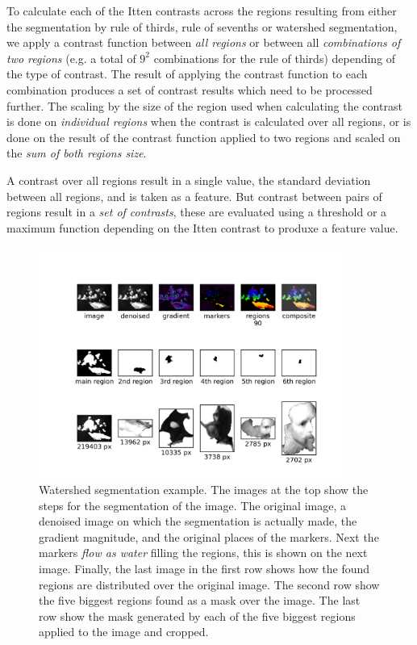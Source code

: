 \documentclass[11pt,a4paper,twoside,openright]{report}
\begin{document}
To calculate each of the Itten contrasts across the regions resulting from
either the segmentation by rule of thirds, rule of sevenths or watershed
segmentation, we apply a contrast function between \emph{all regions} or
between all \emph{combinations of two regions} (e.g. a total of $9^2$
combinations for the rule of thirds) depending of the type of contrast.  The
result of applying the contrast function to each combination produces a set of
contrast results which need to be processed further.  The scaling by the size
of the region used when calculating the contrast is done on \emph{individual
regions} when the contrast is calculated over all regions, or is done on the
result of the contrast function applied to two regions and scaled on the
\emph{sum of both regions size}.

A contrast over all regions result in a single value, the standard deviation
between all regions, and is taken as a feature.  But contrast between pairs of
regions result in a \emph{set of contrasts}, these are evaluated using a
threshold or a maximum function depending on the Itten contrast to produxe a
feature value.

\begin{figure}
\centering
\includegraphics[width=0.9\textwidth]{segm_rembrandt_eu_464}
\caption[Watershed segmentation example]{Watershed segmentation example.  The
images at the top show the steps for the segmentation of the image.  The
original image, a denoised image on which the segmentation is actually made,
the gradient magnitude, and the original places of the markers.  Next the
markers \emph{flow as water} filling the regions, this is shown on the next
image.  Finally, the last image in the first row shows how the found regions
are distributed over the original image.  The second row show the five biggest
regions found as a mask over the image.  The last row show the mask generated
by each of the five biggest regions applied to the image and cropped.}
\label{fig:segm}
\end{figure}
\end{document}

